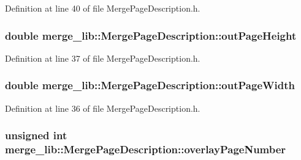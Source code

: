 Definition at line 40 of file Merge\-Page\-Description.\-h.

\hypertarget{structmerge__lib_1_1_merge_page_description_a47d237c4b51e371993f1c855a5ba0af6}{
\subsubsection[{out\-Page\-Height}]{\setlength{\rightskip}{0pt plus 5cm}double merge\-\_\-lib\-::\-Merge\-Page\-Description\-::out\-Page\-Height}}\label{d0/dff/structmerge__lib_1_1_merge_page_description_a47d237c4b51e371993f1c855a5ba0af6}


Definition at line 37 of file Merge\-Page\-Description.\-h.

\hypertarget{structmerge__lib_1_1_merge_page_description_ad6b36eb19b4dae99029fcabb092973ee}{
\subsubsection[{out\-Page\-Width}]{\setlength{\rightskip}{0pt plus 5cm}double merge\-\_\-lib\-::\-Merge\-Page\-Description\-::out\-Page\-Width}}\label{d0/dff/structmerge__lib_1_1_merge_page_description_ad6b36eb19b4dae99029fcabb092973ee}


Definition at line 36 of file Merge\-Page\-Description.\-h.

\hypertarget{structmerge__lib_1_1_merge_page_description_a0de4d9366a467fcac377e8e2bcf8e11f}{
\subsubsection[{overlay\-Page\-Number}]{\setlength{\rightskip}{0pt plus 5cm}unsigned int merge\-\_\-lib\-::\-Merge\-Page\-Description\-::overlay\-Page\-Number}}\label{d0/dff/structmerge__lib_1_1_merge_page_description_a0de4d9366a467fcac377e8e2bcf8e11f}


